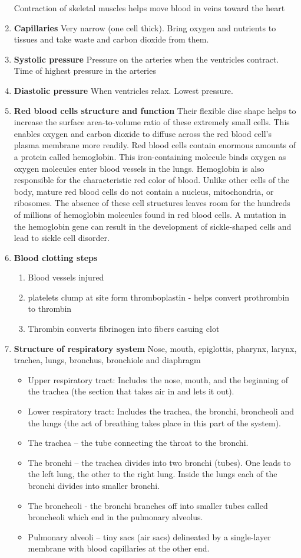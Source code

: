 \documentclass[9pt]{article}
\begin{document}
\begin{enumerate}
   Contraction of skeletal muscles helps move blood in veins toward the heart
  \item {\bf Capillaries} Very narrow (one cell thick). Bring oxygen
    and nutrients to tissues and take waste and carbon dioxide from
    them.
  \item {\bf Systolic pressure} Pressure on the arteries when the
    ventricles contract. Time of highest pressure in the arteries
  \item {\bf Diastolic pressure} When ventricles relax. Lowest
    pressure.
  \item {\bf Red blood cells structure and function} 
  Their flexible disc shape helps to increase the surface area-to-volume ratio
  of these extremely small cells. This enables oxygen and carbon dioxide to
  diffuse across the red blood cell's plasma membrane more readily. Red blood
  cells contain enormous amounts of a protein called hemoglobin. This
  iron-containing molecule binds oxygen as oxygen molecules enter blood vessels
  in the lungs. Hemoglobin is also responsible for the characteristic red color
  of blood. Unlike other cells of the body, mature red blood cells do not
  contain a nucleus, mitochondria, or ribosomes. The absence of these cell
  structures leaves room for the hundreds of millions of hemoglobin molecules
  found in red blood cells. A mutation in the hemoglobin gene can result in the
  development of sickle-shaped cells and lead to sickle cell disorder.
  \item {\bf Blood clotting steps}
  \begin{enumerate}
    \item Blood vessels injured
    \item platelets clump at site form thromboplastin - helps convert prothrombin to thrombin
    \item Thrombin converts fibrinogen into fibers casuing clot
  \end{enumerate}
  \item {\bf Structure of respiratory system} Nose, mouth, epiglottis, pharynx, larynx, trachea, lungs, bronchus, bronchiole and diaphragm
  \begin{itemize}
  \item Upper respiratory tract: Includes the nose, mouth, and the beginning of the trachea (the section that takes air in and lets it out).
  \item Lower respiratory tract: Includes the trachea, the bronchi, broncheoli and the lungs (the act of breathing takes place in this part of the system).
  \item The trachea – the tube connecting the throat to the bronchi.
  \item The bronchi – the trachea divides into two bronchi (tubes). One leads to the left lung, the other to the right lung. Inside the lungs each of the bronchi divides into smaller bronchi.
  \item The broncheoli - the bronchi branches off into smaller tubes called broncheoli which end in the pulmonary alveolus.
  \item Pulmonary alveoli – tiny sacs (air sacs) delineated by a single-layer membrane with blood capillaries at the other end.



\end{itemize}
\end{enumerate}
\end{document}
